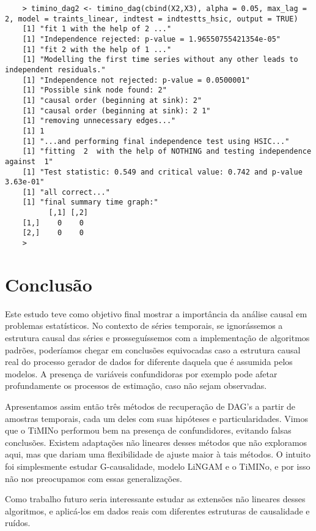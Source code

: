 \documentclass[12pt,letterpaper]{article}
\begin{document}
\begin{lstlisting}
	> timino_dag2 <- timino_dag(cbind(X2,X3), alpha = 0.05, max_lag = 2, model = traints_linear, indtest = indtestts_hsic, output = TRUE)
	[1] "fit 1 with the help of 2 ..."
	[1] "Independence rejected: p-value = 1.96550755421354e-05"
	[1] "fit 2 with the help of 1 ..."
	[1] "Modelling the first time series without any other leads to independent residuals."
	[1] "Independence not rejected: p-value = 0.0500001"
	[1] "Possible sink node found: 2"
	[1] "causal order (beginning at sink): 2"
	[1] "causal order (beginning at sink): 2 1"
	[1] "removing unnecessary edges..."
	[1] 1
	[1] "...and performing final independence test using HSIC..."
	[1] "fitting  2  with the help of NOTHING and testing independence against  1"
	[1] "Test statistic: 0.549 and critical value: 0.742 and p-value 3.63e-01"
	[1] "all correct..."
	[1] "final summary time graph:"
		  [,1] [,2]
	[1,]    0    0
	[2,]    0    0
	> 
\end{lstlisting}

\section{Conclusão}
	Este estudo teve como objetivo final mostrar a importância da análise causal em problemas estatísticos. No contexto de séries temporais, se ignorássemos a estrutura causal das séries e prosseguíssemos com a implementação de algoritmos padrões, poderíamos chegar em conclusões equivocadas caso a estrutura causal real do processo gerador de dados for diferente daquela que é assumida pelos modelos. A presença de variáveis confundidoras por exemplo pode afetar profundamente os processos de estimação, caso não sejam observadas.
	
	Apresentamos assim então três métodos de recuperação de DAG's a partir de amostras temporais, cada um deles com suas hipóteses e particularidades. Vimos que o TiMINo performou bem na presença de confundidores, evitando falsas conclusões. Existem adaptações não lineares desses métodos que não exploramos aqui, mas que dariam uma flexibilidade de ajuste maior à tais métodos. O intuito foi simplesmente estudar G-causalidade, modelo LiNGAM e o TiMINo, e por isso não nos preocupamos com essas generalizações.
	
	Como trabalho futuro seria interessante estudar as extensões não lineares desses algoritmos, e aplicá-los em dados reais com diferentes estruturas de causalidade e ruídos.
\end{document}
